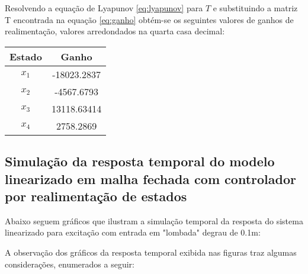     Resolvendo a equação de Lyapunov \ref{eq:lyapunov} para $T$ e substituindo a matriz T encontrada na equação \ref{eq:ganho} obtém-se os seguintes valores de ganhos de realimentação, valores arredondados na quarta casa decimal:
    
    \begin{center}
    \begin{tabular}{|c|c|}
        \hline
        Estado & Ganho\\
        \hline
        \hline
        $x_1$    & -18023.2837\\
        $x_2$    & -4567.6793\\
        $x_3$    & 13118.63414\\   
        $x_4$    & 2758.2869 \\
        \hline
    \end{tabular}
    \end{center}
    
        \subsection{Simulação da resposta temporal do modelo linearizado em malha fechada com controlador por realimentação de estados} \label{sc:analise_resposta}
    
    Abaixo seguem gráficos que ilustram a simulação temporal da resposta do sistema linearizado para excitação com entrada em "lombada" degrau de 0.1m:
    
    A observação dos gráficos da resposta temporal exibida nas figuras   traz algumas considerações, enumerados a seguir:
    
